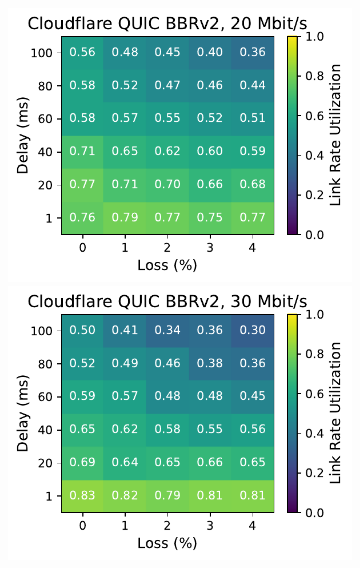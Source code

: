 \begin{figure}[ht]
\begin{subfigure}[b]{0.22\linewidth}
        \includegraphics[width=\linewidth,trim={0 0 2cm 0},clip]{splitting/figures/heatmaps/heatmap_quiche_bbr2_20mbps.pdf}
        \includegraphics[width=\linewidth,trim={0 0 2cm 0},clip]{splitting/figures/heatmaps/heatmap_quiche_bbr2_30mbps.pdf}

\end{subfigure}
\end{figure}
